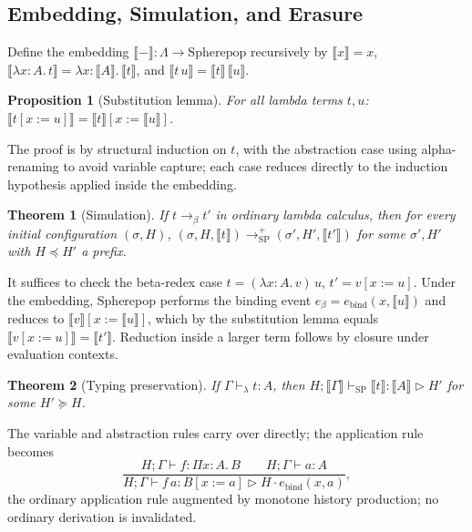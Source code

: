 \documentclass[11pt]{article}
\newtheorem{proposition}{Proposition}[section]
\newtheorem{theorem}{Theorem}[section]
\begin{document}
\subsection{Embedding, Simulation, and Erasure}

Define the embedding $\llbracket - \rrbracket : \Lambda \to \mathrm{Spherepop}$ recursively by $\llbracket x \rrbracket = x$, $\llbracket \lambda x{:}A.\,t \rrbracket = \lambda x{:}\llbracket A \rrbracket.\, \llbracket t \rrbracket$, and $\llbracket t\,u \rrbracket = \llbracket t \rrbracket\, \llbracket u \rrbracket$.

\begin{proposition}[Substitution lemma]
For all lambda terms $t, u$: $\llbracket t[x:=u] \rrbracket = \llbracket t \rrbracket [x := \llbracket u \rrbracket]$.
\end{proposition}

The proof is by structural induction on $t$, with the abstraction case using alpha-renaming to avoid variable capture; each case reduces directly to the induction hypothesis applied inside the embedding.

\begin{theorem}[Simulation]
If $t \longrightarrow_\beta t'$ in ordinary lambda calculus, then for every initial configuration $(\sigma, H)$, $(\sigma, H, \llbracket t \rrbracket) \longrightarrow_{\mathrm{SP}}^{+} (\sigma', H', \llbracket t' \rrbracket)$ for some $\sigma', H'$ with $H \preceq H'$ a prefix.
\end{theorem}

It suffices to check the beta-redex case $t = (\lambda x{:}A.\,v)\,u$, $t' = v[x:=u]$. Under the embedding, Spherepop performs the binding event $e_\beta = e_{\mathrm{bind}}(x, \llbracket u \rrbracket)$ and reduces to $\llbracket v \rrbracket[x := \llbracket u \rrbracket]$, which by the substitution lemma equals $\llbracket v[x:=u] \rrbracket = \llbracket t' \rrbracket$. Reduction inside a larger term follows by closure under evaluation contexts.

\begin{theorem}[Typing preservation]
If $\Gamma \vdash_\lambda t : A$, then $H; \llbracket \Gamma \rrbracket \vdash_{\mathrm{SP}} \llbracket t \rrbracket : \llbracket A \rrbracket \triangleright H'$ for some $H' \succeq H$.
\end{theorem}

The variable and abstraction rules carry over directly; the application rule becomes
\[
\frac{H;\Gamma \vdash f : \Pi x{:}A.\,B \qquad H;\Gamma \vdash a : A}{H;\Gamma \vdash f\,a : B[x:=a] \triangleright H \cdot e_{\mathrm{bind}}(x,a)},
\]
the ordinary application rule augmented by monotone history production; no ordinary derivation is invalidated.
\end{document}
